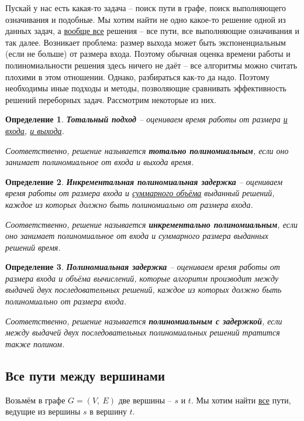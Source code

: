 \documentclass[a4paper,12pt]{article}
\newtheorem{definition}{Определение}
\begin{document}
Пускай у нас есть какая-то задача -- поиск пути в графе, поиск выполняющего означивания и подобные. Мы хотим найти не одно какое-то решение одной из данных задач, а \underline{вообще все} решения -- все пути, все выполняющие означивания и так далее. Возникает проблема: размер выхода может быть экспоненциальным (если не больше) от размера входа. Поэтому обычная оценка времени работы и полиномиальности решения здесь ничего не даёт -- все алгоритмы можно считать плохими в этом отношении. Однако, разбираться как-то да надо. Поэтому необходимы иные подходы и методы, позволяющие сравнивать эффективность решений переборных задач. Рассмотрим некоторые из них.
\begin{definition}
    \textbf{Тотальный подход} -- оцениваем время работы от размера \underline{и входа}, \underline{и выхода}.
    
    Соответственно, решение называется \textbf{тотально полиномиальным}, если оно занимает полиномиальное от входа и выхода время.
\end{definition}
\begin{definition}
    \textbf{Инкрементальная полиномиальная задержка} -- оцениваем время работы от размера входа и \underline{суммарного объёма} выданный решений, каждое из которых должно быть полиномиально от размера входа.
    
    Соответственно,  решение называется \textbf{инкрементально полиномиальным}, если оно занимает полиномиальное от входа и суммарного размера выданных решений время.
\end{definition}
\begin{definition}
    \textbf{Полиномиальная задержка} -- оцениваем время работы от размера входа и объёма вычислений, которые алгоритм производит между выдачей двух последовательных решений, каждое из которых должно быть полиномиально от размера входа.
    
    Соответственно, решение называется \textbf{полиномиальным с задержкой}, если между выдачей двух последовательных полиномиальных решений тратится также полином.
\end{definition}


\subsection{Все пути между вершинами}

Возьмём в графе $G = (V,\ E)$ две вершины -- $s$ и $t$. Мы хотим найти \underline{все} пути, ведущие из вершины $s$ в вершину $t$.
\end{document}
